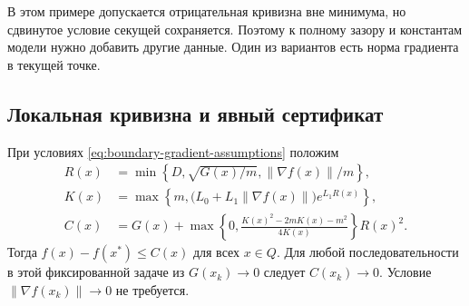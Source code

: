 В этом примере допускается отрицательная кривизна вне минимума,
но сдвинутое условие секущей сохраняется. Поэтому к полному зазору
и константам модели нужно добавить другие данные. Один из вариантов
есть норма градиента в текущей точке.

\subsection{Локальная кривизна и явный сертификат}

\begin{theorem}
\label{thm:boundary-local-certificate}
При условиях \eqref{eq:boundary-gradient-assumptions} положим
\begin{align}
 R(x)&=\min\left\{D,\sqrt{G(x)/m},\|\nabla f(x)\|/m\right\},
       \label{eq:boundary-local-radius}\\
 K(x)&=\max\left\{m,
    \bigl(L_0+L_1\|\nabla f(x)\|\bigr)e^{L_1R(x)}\right\},
       \label{eq:boundary-local-curvature}\\
 C(x)&=G(x)+
   \max\left\{0,\frac{K(x)^2-2mK(x)-m^2}{4K(x)}\right\}R(x)^2.
       \label{eq:boundary-local-certificate}
\end{align}
Тогда $f(x)-f(x^*)\le C(x)$ для всех $x\in Q$.
Для любой последовательности в этой фиксированной задаче из
$G(x_k)\to0$ следует $C(x_k)\to0$. Условие
$\|\nabla f(x_k)\|\to0$ не требуется.
\end{theorem}
